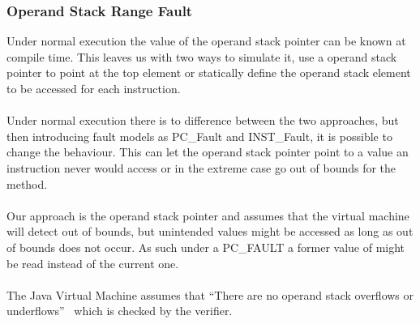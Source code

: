 \subsubsection{Operand Stack Range Fault}
Under normal execution the value of the operand stack pointer can be known at compile  time. This leaves us with two ways to simulate it, use a operand stack pointer to point at the top element or statically define the operand stack element to be accessed for each instruction.\\\\
Under normal execution there is to difference between the two approaches, but then introducing fault models as PC\_Fault and INST\_Fault, it is possible to change the behaviour. This can let the operand stack pointer point to a value an instruction never would access or in the extreme case go out of bounds for the method.\\\\
Our approach is the operand stack pointer and assumes that the virtual machine will detect out of bounds, but unintended values might be accessed as long as out of bounds does not occur. As such under a PC\_FAULT a former value of might be read instead of the current one.\\\\
The Java Virtual Machine assumes that ``There are no operand stack overflows or underflows''~\cite[c. 4.10]{java_spec} which is checked by the verifier.

